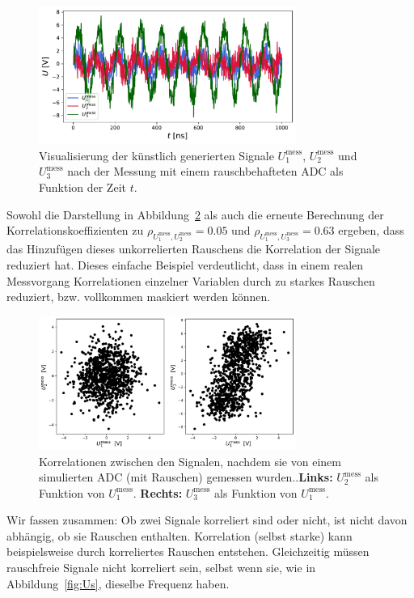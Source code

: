 \begin{figure}[H]
\centering
\includegraphics[width=0.75\textwidth]{Figures/Umess.pdf}
\caption{Visualisierung der künstlich generierten Signale $U_1^{\mathrm{mess}}$, $U_2^{\mathrm{mess}}$ und $U_3^{\mathrm{mess}}$ nach der Messung mit einem rauschbehafteten ADC  als Funktion der Zeit $t$.}
\label{fig:Umess}
\end{figure}

Sowohl die Darstellung in Abbildung~\ref{fig:Umesskorr} als auch die erneute Berechnung der Korrelationskoeffizienten zu $\rho_{U_1^{\mathrm{mess}}, U_2^{\mathrm{mess}}}=0.05$ und $\rho_{U_1^{\mathrm{mess}}, U_3^{\mathrm{mess}}}=0.63$ ergeben, dass das Hinzufügen dieses unkorrelierten Rauschens die Korrelation der Signale reduziert hat. Dieses einfache Beispiel verdeutlicht, dass in einem realen Messvorgang Korrelationen einzelner Variablen durch zu starkes Rauschen reduziert, bzw. vollkommen maskiert werden können.


\begin{figure}[H]
\centering
\includegraphics[width=0.75\textwidth]{Figures/Umesskorrplot.pdf}
\caption{Korrelationen zwischen den Signalen, nachdem sie von einem simulierten ADC (mit Rauschen) gemessen wurden..\textbf{Links:} $U_2^{\mathrm{mess}}$ als Funktion von $U_1^{\mathrm{mess}}$. \textbf{Rechts:} $U_3^{\mathrm{mess}}$ als Funktion von $U_1^{\mathrm{mess}}$.}
\label{fig:Umesskorr}
\end{figure}

Wir fassen zusammen: Ob zwei Signale korreliert sind oder nicht, ist nicht davon abhängig, ob sie Rauschen enthalten. Korrelation (selbst starke) kann beispielsweise durch korreliertes Rauschen entstehen. Gleichzeitig müssen rauschfreie Signale nicht korreliert sein, selbst wenn sie, wie in Abbildung~\ref{fig:Us}, dieselbe Frequenz haben.


